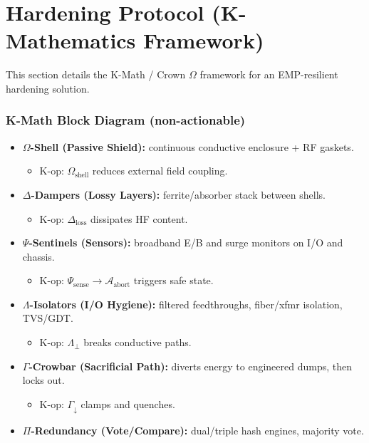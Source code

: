 \documentclass[11pt, a4paper]{article}
\begin{document}
\newpage
\part{Hardening Protocol (K-Mathematics Framework)}
\label{part:k_math_hardening}
This section details the K-Math / Crown $\Omega$ framework for an EMP-resilient hardening solution.

\section{K-Math Block Diagram (non-actionable)}
\begin{itemize}
    \item \textbf{$\Omega$-Shell (Passive Shield):} continuous conductive enclosure + RF gaskets.
        \begin{itemize}
            \item K-op: $\Omega_{\text{shell}}$ reduces external field coupling.
        \end{itemize}
    \item \textbf{$\Delta$-Dampers (Lossy Layers):} ferrite/absorber stack between shells.
        \begin{itemize}
            \item K-op: $\Delta_{\text{loss}}$ dissipates HF content.
        \end{itemize}
    \item \textbf{$\Psi$-Sentinels (Sensors):} broadband E/B and surge monitors on I/O and chassis.
        \begin{itemize}
            \item K-op: $\Psi_{\text{sense}} \to \mathcal{A}_{\text{abort}}$ triggers safe state.
        \end{itemize}
    \item \textbf{$\Lambda$-Isolators (I/O Hygiene):} filtered feedthroughs, fiber/xfmr isolation, TVS/GDT.
        \begin{itemize}
            \item K-op: $\Lambda_{\perp}$ breaks conductive paths.
        \end{itemize}
    \item \textbf{$\Gamma$-Crowbar (Sacrificial Path):} diverts energy to engineered dumps, then locks out.
        \begin{itemize}
            \item K-op: $\Gamma_{\downarrow}$ clamps and quenches.
        \end{itemize}
    \item \textbf{$\Pi$-Redundancy (Vote/Compare):} dual/triple hash engines, majority vote.

\end{itemize}
\end{document}
